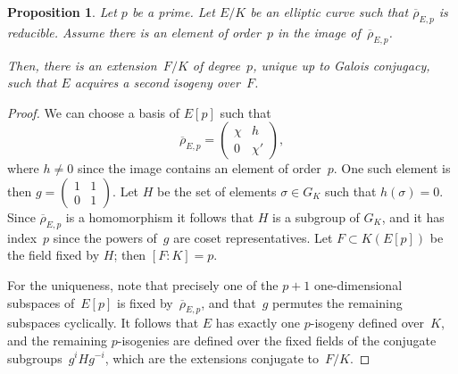 \documentclass[12pt, reqno]{amsart}
\newcommand{\rhobar}{{\overline{\rho}}}
\numberwithin{equation}{section}
\newtheorem{proposition}[theorem]{Proposition}
\theoremstyle{definition}
\theoremstyle{remark}
\begin{document}
\begin{proposition} \label{P:fieldF}
Let $p$ be a prime. Let $E/K$ be an elliptic curve such that
$\rhobar_{E,p}$ is reducible. Assume there is an element of order~$p$
in the image of~$\rhobar_{E,p}$.

Then, there is an extension~$F/K$ of degree~$p$, unique up to Galois
conjugacy, such that $E$ acquires a second isogeny over~$F$.
\end{proposition}
\begin{proof} We can choose a basis of $E[p]$ such that
\[
\rhobar_{E,p} =  \begin{pmatrix}
                            \chi& h \\
                            0 & \chi'
                            \end{pmatrix},
\]
where $h\neq0$ since the image contains an element of order~$p$.  One
such element is then $g=\left(\begin{smallmatrix} 1 & 1 \\ 0 &
  1 \end{smallmatrix} \right)$.  Let $H$ be the set of elements
$\sigma \in G_K$ such that $h(\sigma) = 0$. Since $\rhobar_{E,p}$ is a
homomorphism it follows that $H$ is a subgroup of $G_K$, and it has
index~$p$ since the powers of~$g$ are coset representatives.  Let $F
\subset K(E[p])$ be the field fixed by $H$; then $[F : K] =p$.

For the uniqueness, note that precisely one of the $p+1$
one-dimensional subspaces of~$E[p]$ is fixed by~$\rhobar_{E,p}$, and
that~$g$ permutes the remaining subspaces cyclically.  It follows that
$E$ has exactly one $p$-isogeny defined over~$K$, and the remaining
$p$-isogenies are defined over the fixed fields of the conjugate
subgroups~$g^iHg^{-i}$, which are the extensions conjugate to~$F/K$.
\end{proof}
\end{document}

